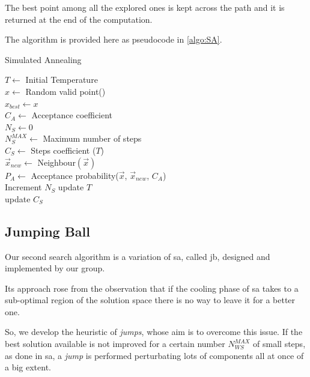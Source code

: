 \documentclass[journal]{IEEEtran}
\begin{document}
The best point among all the explored ones is kept across the path and it is returned at the end of the computation.

The algorithm is provided here as pseudocode in \autoref{algo:SA}.

\begin{algorithm}
\caption{Simulated Annealing} \label{algo:SA}

$T \gets$ Initial Temperature \\
$x \gets$ Random valid point() \\
$x_{best} \gets x$ \\
$C_A \gets$ Acceptance coefficient \\
$N_S \gets 0$ \\
$N_S^{MAX} \gets $ Maximum number of steps \\

 {
	$C_S \gets$ Steps coefficient ($T$) \\
	 {
		$\vec{x}_{new} \gets$ Neighbour$(\vec{x})$\\
		$P_A \gets$ Acceptance probability($\vec{x}$, $\vec{x}_{new}$, $C_A$) \\
		Increment $N_S$
	}
	update $T$\\
	update $C_S$\\
}
\end{algorithm}

\subsection{Jumping Ball}

Our second search algorithm is a variation of \gls{sa}, called \gls{jb}, designed and implemented by our group.

Its approach rose from the observation that if the cooling phase of \gls{sa} takes to a sub-optimal region of the solution space there is no way to leave it for a better one.

So, we develop the heuristic of \emph{jumps}, whose aim is to overcome this issue. If the best solution available is not improved for a certain number $N_{WS}^{MAX}$ of small steps, as done in \gls{sa}, a \emph{jump} is performed perturbating lots of components all at once of a big extent.
\end{document}
